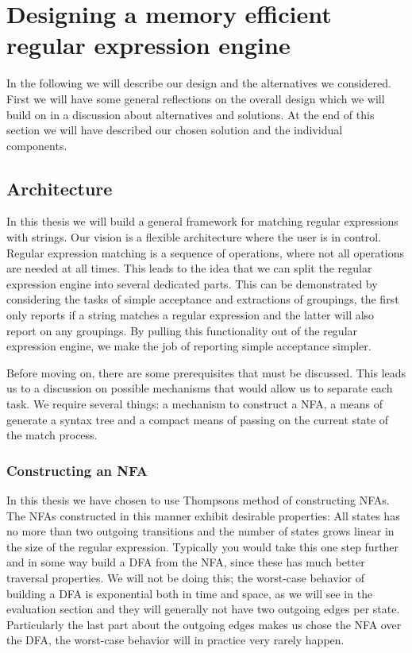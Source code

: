 \section{Designing a memory efficient regular expression engine}
\label{sec:design}

In the following we will describe our design and the alternatives we
considered. First we will have some general reflections on the overall
design which we will build on in a discussion about alternatives and
solutions. At the end of this section we will have described our
chosen solution and the individual components.

\subsection{Architecture}

In this thesis we will build a general framework for matching regular
expressions with strings. Our vision is a flexible architecture where
the user is in control. Regular expression matching is a sequence of
operations, where not all operations are needed at all times. This
leads to the idea that we can split the regular expression engine into
several dedicated parts. This can be demonstrated by considering the
tasks of simple acceptance and extractions of groupings, the first
only reports if a string matches a regular expression and the latter
will also report on any groupings. By pulling this functionality out
of the regular expression engine, we make the job of reporting simple
acceptance simpler.

Before moving on, there are some prerequisites that must be
discussed. This leads us to a discussion on possible mechanisms that
would allow us to separate each task. We require several things: a
mechanism to construct a NFA, a means of generate a syntax tree and a
compact means of passing on the current state of the match process.


\subsubsection{Constructing an NFA}
In this thesis we have chosen to use Thompsons method of constructing
NFAs. The NFAs constructed in this manner exhibit desirable
properties: All states has no more than two outgoing transitions and
the number of states grows linear in the size of the regular
expression. Typically you would take this one step further and in some
way build a DFA from the NFA, since these has much better traversal
properties. We will not be doing this; the worst-case behavior of
building a DFA is exponential both in time and space, as we will see
in the evaluation section and they will generally not have two
outgoing edges per state. Particularly the last part about the
outgoing edges makes us chose the NFA over the DFA, the worst-case
behavior will in practice very rarely happen.

